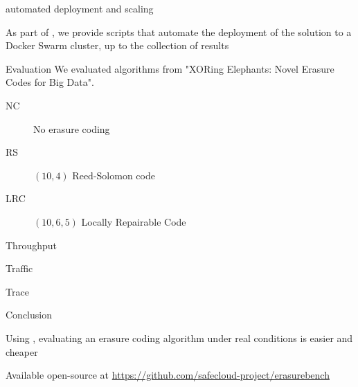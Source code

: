 \begin{frame}{\sys\enspace automated deployment and scaling}
  \begin{snugshade}
    As part of \sys, we provide scripts that automate the deployment of the solution to a Docker Swarm cluster, up to the collection of results
  \end{snugshade}
\end{frame}

\subtitle[Evaluation]{Evaluation}

\begin{frame}{Evaluation}
    We evaluated algorithms from "XORing Elephants: Novel Erasure Codes for Big Data".
    \begin{description}
        \item[NC] No erasure coding
        \item[RS] $(10,4)$ Reed-Solomon code
        \item[LRC] $(10,6,5)$ Locally Repairable Code
    \end{description}
\end{frame}

\begin{frame}{Throughput}
    \begin{figure}
        
    \end{figure}
\end{frame}

\begin{frame}{Traffic}
    \begin{figure}
        
    \end{figure}
\end{frame}

\begin{frame}{Trace}
    \begin{figure}
        
    \end{figure}
\end{frame}

\subtitle[Conclusion]{Conclusion}

\begin{frame}{Conclusion}

  \begin{snugshade}
    Using \sys, evaluating an erasure coding algorithm under real conditions is easier and cheaper
  \end{snugshade}
  
  \begin{snugshade}
    Available open-source at \url{https://github.com/safecloud-project/erasurebench}    
  \end{snugshade}

\end{frame}




